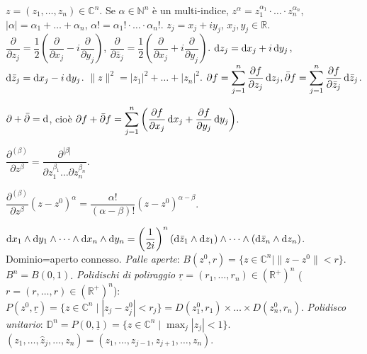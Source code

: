 $z=(z_1, \dots, z_n) \in \mathbb{C}^n$. Se $\alpha \in \mathbb{N}^n$ è un multi-indice, $z^{\alpha}=z_1^{\alpha_1}\cdot \ldots \cdot z_n^{\alpha_n}$, $|\alpha|=\alpha_1+\dots+\alpha_n$, $\alpha!=\alpha_1!\cdot\ldots\cdot\alpha_n!$.
$z_j=x_j+iy_j$, $x_j,y_j \in \mathbb{R}$. $\dfrac{\partial}{\partial z_j}=\dfrac{1}{2}\left(\dfrac{\partial}{\partial x_j}-i\dfrac{\partial}{\partial y_j}\right)$, $\dfrac{\partial}{\partial\bar{z}_j}=\dfrac{1}{2}\left(\dfrac{\partial}{\partial x_j}+i\dfrac{\partial}{\partial y_j}\right)$.
$\mathop{}\!\mathrm{d} z_j=\mathop{}\!\mathrm{d} x_j+i\mathop{}\!\mathrm{d} y_j$, $\mathop{}\!\mathrm{d}\bar{z}_j=\mathop{}\!\mathrm{d} x_j-i\mathop{}\!\mathrm{d} y_j$. $\|z\|^2=|z_1|^2+\dots+|z_n|^2$. $\displaystyle \partial f=\sum_{j=1}^n \dfrac{\partial f}{\partial z_j}\mathop{}\!\mathrm{d} z_j, \bar{\partial} f=\sum_{j=1}^n \dfrac{\partial f}{\partial \bar{z}_j}\mathop{}\!\mathrm{d} \bar{z}_j$.

\begin{exc}
  $\partial+\bar{\partial}=\mathop{}\!\mathrm{d}$, cioè $\displaystyle \partial f+\bar{\partial}f=\sum_{j=1}^n \left(\dfrac{\partial f}{\partial x_j}\mathop{}\!\mathrm{d} x_j+\dfrac{\partial f}{\partial y_j}\mathop{}\!\mathrm{d} y_j\right)$.
\end{exc}

$\dfrac{\partial^{(\beta)}}{\partial z^\beta}=\dfrac{\partial^{|\beta|}}{\partial z_1^{\beta_1}\dots\partial z_n^{\beta_n}}$.

\begin{exc}
  $\dfrac{\partial^{(\beta)}}{\partial z^\beta}(z-z^0)^\alpha=\dfrac{\alpha!}{(\alpha-\beta)!}(z-z^0)^{\alpha-\beta}$.
\end{exc}

$\diff x_1 \wedge \diff y_1 \wedge \dots \wedge \diff x_n \wedge \diff y_n=\left(\dfrac{1}{2i}\right)^n(\diff\bar{z}_1\wedge \diff z_1)\wedge \dots \wedge (\diff\bar{z}_n \wedge \diff z_n)$.
Dominio=aperto connesso. \textit{Palle aperte}: $B(z^0, r)=\{z \in \mathbb{C}^n \mid \|z-z^0\|<r\}$. $B^n=B(0,1)$.
\textit{Polidischi di poliraggio $\underline{r}=(r_1,\dots,r_n) \in (\mathbb{R}^+)^n$} ($r=(r, \dots, r) \in (\mathbb{R}^+)^n$): $P(z^0, \underline{r})=\{z \in \mathbb{C}^n \mid |z_j-z_j^0|<r_j\}=D(z_1^0, r_1) \times \dots \times D(z_n^0, r_n)$.
\textit{Polidisco unitario}: $\displaystyle \mathbb{D}^n=P(0, \underline{1})=\{z \in \mathbb{C}^n \mid \max_j |z_j|<1\}$. $(z_1, \dots, \hat{z}_j,\dots, z_n)=(z_1, \dots, z_{j-1}, z_{j+1}, \dots, z_n)$.

